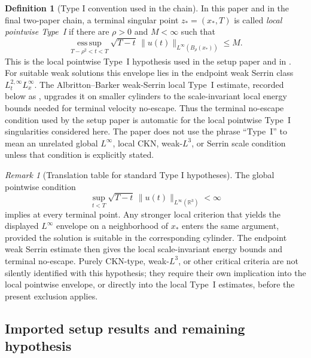 \documentclass[11pt]{amsart}
\numberwithin{equation}{section}
\theoremstyle{plain}
\theoremstyle{definition}
\newtheorem{definition}[definition]{Definition}
\theoremstyle{remark}
\newtheorem{remark}[remark]{Remark}
\newcommand{\esssup}{\operatorname*{ess\,sup}}
\begin{document}
\begin{definition}[Type I convention used in the chain]
\label{def:pointwise-typeI-convention}
In this paper and in the final two-paper chain, a terminal singular point
\(z_*=(x_*,T)\) is called \emph{local pointwise Type~I} if there are
\(\rho>0\) and \(M<\infty\) such that
\[
   \esssup_{T-\rho^2<t<T}
   \sqrt{T-t}\,\|u(t)\|_{L^\infty(B_\rho(x_*))}\le M .
\]
This is the local pointwise Type~I hypothesis used in the setup paper and in
.  For suitable weak solutions this envelope lies
in the endpoint weak Serrin class \(L^{2,\infty}_tL^\infty_x\).  The
Albritton--Barker weak-Serrin local Type~I estimate, recorded below as
, upgrades it on smaller cylinders to
the scale-invariant local energy bounds needed for terminal velocity
no-escape.  Thus the terminal no-escape condition used by the setup paper is
automatic for the local pointwise Type~I singularities considered here.
The paper does not use the phrase ``Type~I'' to mean an unrelated global
\(L^\infty\), local CKN, weak-\(L^3\), or Serrin scale condition unless that
condition is explicitly stated.
\end{definition}

\begin{remark}[Translation table for standard Type I hypotheses]
\label{rem:typeI-translation-table}
The global pointwise condition
\[
   \sup_{t<T}\sqrt{T-t}\,
      \|u(t)\|_{L^\infty(\mathbb R^3)}<\infty
\]
implies  at every terminal point.  Any
stronger local criterion that yields the displayed \(L^\infty\) envelope on a
neighborhood of \(x_*\) enters the same argument, provided the solution is
suitable in the corresponding cylinder.  The endpoint weak Serrin estimate then
gives the local scale-invariant energy bounds and terminal no-escape.
Purely CKN-type, weak-\(L^3\), or other critical criteria are not silently
identified with this hypothesis; they require their own implication into the
local pointwise envelope, or directly into the local Type~I estimates, before the
present exclusion applies.
\end{remark}

\subsection{Imported setup results and remaining hypothesis}
\label{subsec:imported-setup-results}
\end{document}
